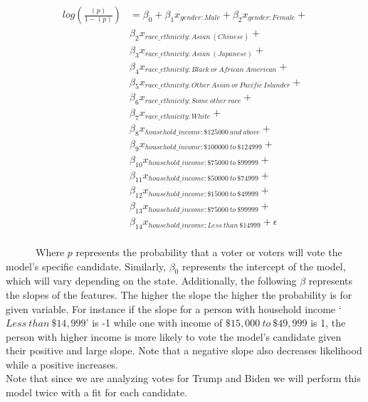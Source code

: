 \documentclass[
]{article}
\begin{document}
\begin{align*}
log(\frac{(p)}{1-(p)}) &= {\beta}_0 + 
                            {\beta}_1x_{gender : Male} + {\beta}_2x_{gender : Female} + \\
                        &    {\beta}_2x_{race\_ethnicity : Asian\: (Chinese)} + \\
                        &    {\beta}_3x_{race\_ethnicity : Asian\: (Japanese)} + \\
                        &    {\beta}_4x_{race\_ethnicity : Black\: or\: African\: American} + \\
                        &    {\beta}_5x_{race\_ethnicity : Other\: Asian\: or\: Pacific\: Islander} + \\
                        &    {\beta}_6x_{race\_ethnicity : Some\: other\: race} + \\
                        &    {\beta}_7x_{race\_ethnicity : White} + \\
                        &    {\beta}_8x_{household\_income : \$125000\: and\: above} + \\
                        &    {\beta}_9x_{household\_income : \$100000\: to\: \$124999} + \\
                        &    {\beta}_10x_{household\_income : \$75000\: to\: \$99999} + \\
                        &    {\beta}_11x_{household\_income : \$50000\: to\: \$74999} + \\
                        &    {\beta}_12x_{household\_income : \$15000\: to\: \$49999} + \\
                        &    {\beta}_13x_{household\_income : \$75000\: to\: \$99999} + \\
                        &    {\beta}_14x_{household\_income : Less\: than\: \$14999} + \epsilon\\
\end{align*}

~~~~~~Where \(p\) represents the probability that a voter or voters will
vote the model's specific candidate. Similarly, \(\beta_0\) represents
the intercept of the model, which will vary depending on the state.
Additionally, the following \(\beta\) represents the slopes of the
features. The higher the slope the higher the probability is for given
variable. For instance if the slope for a person with household income
`\(Less\: than\: \$14,999\)' is -1 while one with income of
\(\$15,000\: to\: \$49,999\) is 1, the person with higher income is more
likely to vote the model's candidate given their positive and large
slope. Note that a negative slope also decreases likelihood while a
positive increases.\\
\hspace*{0.333em}\hspace*{0.333em}\hspace*{0.333em}\hspace*{0.333em}\hspace*{0.333em}\hspace*{0.333em}Note
that since we are analyzing votes for Trump and Biden we will perform
this model twice with a fit for each candidate.
\end{document}
